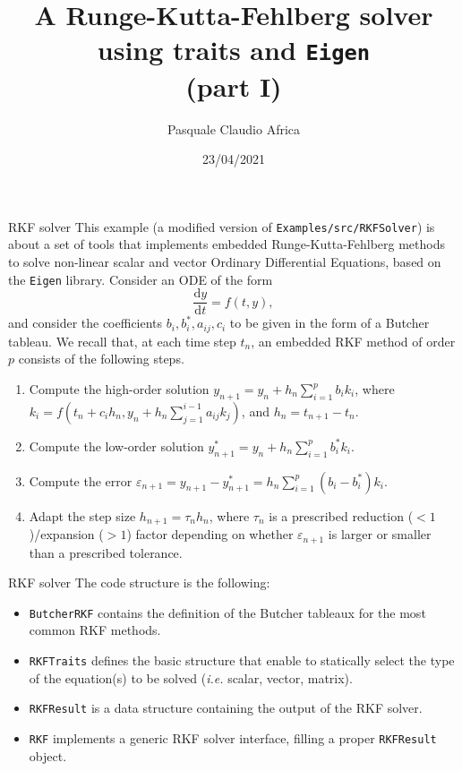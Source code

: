 \documentclass[10pt]{beamer}
\begin{document}
    \title{A Runge-Kutta-Fehlberg solver\protect\\using traits and \texttt{Eigen}\protect\\(part I)}
    \author{Pasquale Claudio Africa}
    \date{23/04/2021}

\begin{frame}
    \maketitle
\end{frame}

\begin{frame}{RKF solver}
This example (a modified version of \texttt{Examples/src/RKFSolver}) is about a set of tools that implements embedded Runge-Kutta-Fehlberg methods to solve non-linear scalar and vector Ordinary Differential Equations, based on the \texttt{Eigen} library.
\vfill
Consider an ODE of the form
\begin{equation*}
\frac{\mathrm{d} y}{\mathrm{d} t} = f(t, y),
\end{equation*}
and consider the coefficients \(b_i, b_i^*, a_{ij}, c_i\) to be given in the form of a Butcher tableau.
We recall that, at each time step \(t_n\), an embedded RKF method of order \(p\) consists of the following steps.
\begin{enumerate}
\item Compute the high-order solution \(y_{n+1} = y_{n} + h_n \sum_{i=1}^p b_i k_i\), where \(k_i = f\left(t_n + c_i h_n, y_n + h_n\sum_{j=1}^{i-1}a_{ij}k_j\right)\), and \(h_n = t_{n+1} - t_n\).
\item Compute the low-order solution \(y_{n+1}^* = y_{n} + h_n \sum_{i=1}^p b_i^* k_i\).
\item Compute the error \(\varepsilon_{n+1} = y_{n+1} - y_{n+1}^* = h_n \sum_{i=1}^p(b_i - b_i^*)k_i\).
\item Adapt the step size \(h_{n+1} = \tau_{n} h_{n}\), where \(\tau_{n}\) is a prescribed reduction (\(<1\))/expansion (\(>1\)) factor depending on whether \(\varepsilon_{n+1}\) is larger or smaller than a prescribed tolerance.
\end{enumerate}
\end{frame}

\begin{frame}{RKF solver}
The code structure is the following:
\begin{itemize}
\item \texttt{ButcherRKF} contains the definition of the Butcher tableaux for the most common RKF methods.
\item \texttt{RKFTraits} defines the basic structure that enable to statically select the type of the equation(s) to be solved (\textit{i.e.} scalar, vector, matrix).
\item \texttt{RKFResult} is a data structure containing the output of the RKF solver.
\item \texttt{RKF} implements a generic RKF solver interface, filling a proper \texttt{RKFResult} object.
\end{itemize}
\end{frame}
\end{document}
